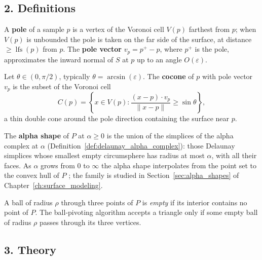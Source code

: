 \subsection{2. Definitions}

\begin{definition}\label{def:shape_pole}
  A \textbf{pole} of a sample $p$ is a vertex of the Voronoi cell $V(p)$
  farthest from $p$; when $V(p)$ is unbounded the pole is taken on the far side
  of the surface, at distance $\ge \operatorname{lfs}(p)$ from $p$. The
  \textbf{pole vector} $v_p = p^{+} - p$, where $p^{+}$ is the pole, approximates
  the inward normal of $S$ at $p$ up to an angle $O(\varepsilon)$.
\end{definition}

\begin{definition}[Cocone]\label{def:shape_cocone}
  Let $\theta \in (0, \pi/2)$, typically $\theta = \arcsin(\varepsilon)$. The
  \textbf{cocone} of $p$ with pole vector $v_p$ is the subset of the Voronoi
  cell
  \[
  C(p) = \left\{ x \in V(p) : \frac{(x - p) \cdot v_p}{\| x - p \|}
          \ge \sin \theta \right\},
  \]
  a thin double cone around the pole direction containing the surface near $p$.
\end{definition}

\begin{definition}\label{def:shape_alpha_shape}
  The \textbf{alpha shape} of $P$ at $\alpha \ge 0$ is the union of the
  simplices of the alpha complex at $\alpha$
  (Definition~\ref{def:delaunay_alpha_complex}): those Delaunay simplices whose
  smallest empty circumsphere has radius at most $\alpha$, with all their
  faces. As $\alpha$ grows from $0$ to $\infty$ the alpha shape interpolates
  from the point set to the convex hull of $P$ \cite{edelsbrunner1983alpha};
  the family is studied in Section~\ref{sec:alpha_shapes} of
  Chapter~\ref{ch:surface_modeling}.
\end{definition}

\begin{definition}\label{def:shape_empty_ball}
  A ball of radius $\rho$ through three points of $P$ is \emph{empty} if its
  interior contains no point of $P$. The ball-pivoting algorithm accepts a
  triangle only if some empty ball of radius $\rho$ passes through its three
  vertices.
\end{definition}

\subsection{3. Theory}

